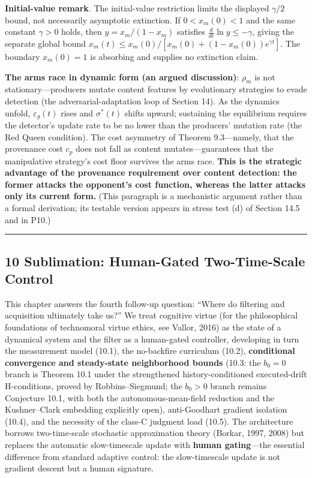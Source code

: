 \documentclass[
  11pt]{article}
\begin{document}
\textbf{Initial-value remark}. The initial-value restriction limits the
displayed \(\gamma/2\) bound, not necessarily asymptotic extinction. If
\(0<x_m(0)<1\) and the same constant \(\gamma>0\) holds, then
\(y=x_m/(1-x_m)\) satisfies \(\frac{d}{dt}\ln y\le-\gamma\), giving the
separate global bound
\(x_m(t)\le x_m(0)/[x_m(0)+(1-x_m(0))e^{\gamma t}]\). The boundary
\(x_m(0)=1\) is absorbing and supplies no extinction claim.

\textbf{The arms race in dynamic form (an argued discussion)}:
\(\rho_m\) is not stationary---producers mutate content features by
evolutionary strategies to evade detection (the adversarial-adaptation
loop of Section 14). As the dynamics unfold, \(\varepsilon_g(t)\) rises
and \(\sigma^*(t)\) shifts upward; sustaining the equilibrium requires
the detector's update rate to be no lower than the producers' mutation
rate (the Red Queen condition). The cost asymmetry of Theorem
9.3---namely, that the provenance cost \(c_p\) does not fall as content
mutates---guarantees that the manipulative strategy's cost floor
survives the arms race. \textbf{This is the strategic advantage of the
provenance requirement over content detection: the former attacks the
opponent's cost function, whereas the latter attacks only its current
form.} (This paragraph is a mechanistic argument rather than a formal
derivation; its testable version appears in stress test (d) of Section
14.5 and in P10.)

\begin{center}\rule{0.5\linewidth}{0.5pt}\end{center}

\subsection{10 Sublimation: Human-Gated Two-Time-Scale
Control}\label{sublimation-human-gated-two-time-scale-control}

This chapter answers the fourth follow-up question: ``Where do filtering
and acquisition ultimately take us?'' We treat cognitive virtue (for the
philosophical foundations of technomoral virtue ethics, see Vallor,
2016) as the state of a dynamical system and the filter as a human-gated
controller, developing in turn the measurement model (10.1), the
no-backfire curriculum (10.2), \textbf{conditional convergence and
steady-state neighborhood bounds} (10.3: the \(b_0=0\) branch is Theorem
10.1 under the strengthened history-conditioned executed-drift
H-conditions, proved by Robbins--Siegmund; the \(b_0>0\) branch remains
Conjecture 10.1, with both the autonomous-mean-field reduction and the
Kushner--Clark embedding explicitly open), anti-Goodhart gradient
isolation (10.4), and the necessity of the class-C judgment load (10.5).
The architecture borrows two-time-scale stochastic approximation theory
(Borkar, 1997, 2008) but replaces the automatic slow-timescale update
with \textbf{human gating}---the essential difference from standard
adaptive control: the slow-timescale update is not gradient descent but
a human signature.
\end{document}
